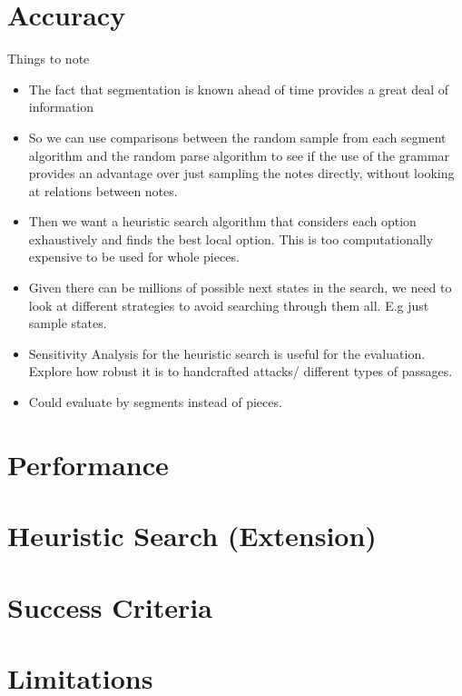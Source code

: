 \documentclass[12pt,a4paper,twoside,openright]{report}
\begin{document}
\section{Accuracy}
Things to note
\begin{itemize}
  \item The fact that segmentation is known ahead of time provides a great deal of information \cite{gothamWhatIfWhen2021}
  \item So we can use comparisons between the random sample from each segment algorithm and the random parse algorithm to see if the use of the grammar provides an advantage over just sampling the notes directly, without looking at relations between notes.
  \item Then we want a heuristic search algorithm that considers each option exhaustively and finds the best local option. This is too computationally expensive to be used for whole pieces. 
  \item Given there can be millions of possible next states in the search, we need to look at different strategies to avoid searching through them all. E.g just sample states. 
  \item Sensitivity Analysis for the heuristic search is useful for the evaluation. Explore how robust it is to handcrafted attacks/ different types of passages.
  \item Could evaluate by segments instead of pieces. 
\end{itemize}

\section{Performance}

\section{Heuristic Search (Extension)}

\section{Success Criteria}

\section{Limitations}


\end{document}
